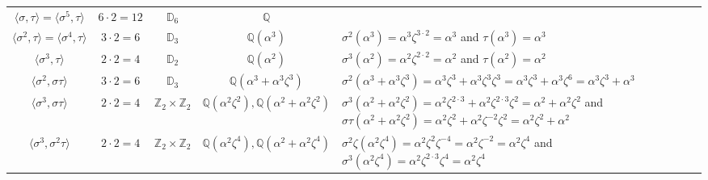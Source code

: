 \documentclass{article}
\theoremstyle{definition}
\begin{document}
\begin{tabular}{ c c c c | p{7.5cm} }
  \hline
  $\langle \sigma, \tau \rangle = \langle \sigma^5,\tau \rangle$ & $6\cdot2=12$ & $\mathbb{D}_6$ & $\mathbb{Q}$ & \\
  $\langle \sigma^2, \tau \rangle = \langle \sigma^4,\tau \rangle$ & $3\cdot2=6$ & $\mathbb{D}_3$ & $\mathbb{Q}(\alpha^3)$ &
      $\sigma^2(\alpha^3)=\alpha^3\zeta^{3\cdot 2}=\alpha^3$ and $\tau(\alpha^3)=\alpha^3$\\
  $\langle \sigma^3, \tau \rangle$ & $2\cdot2=4$ & $\mathbb{D}_2$ & $\mathbb{Q}(\alpha^2)$ &
      $\sigma^3(\alpha^2)=\alpha^2\zeta^{2\cdot 2}=\alpha^2$ and $\tau(\alpha^2)=\alpha^2$\\
  \hline
  $\langle \sigma^2, \sigma\tau \rangle$ & $3\cdot 2=6$ & $\mathbb{D}_3$ & $\mathbb{Q}(\alpha^3+\alpha^3\zeta^3)$ &
      $\sigma^2(\alpha^3 + \alpha^3 \zeta^3) = \alpha^3\zeta^3 + \alpha^3 \zeta^3\zeta^3 = \alpha^3\zeta^3 + \alpha^3\zeta^6 = \alpha^3\zeta^3+\alpha^3$\\
  $\langle \sigma^3, \sigma\tau \rangle$ & $2\cdot2=4$ & $\mathbb{Z}_2 \times \mathbb{Z}_2$ & $\mathbb{Q}(\alpha^2\zeta^2),\mathbb{Q}(\alpha^2+\alpha^2\zeta^2)$ &
      $\sigma^3(\alpha^2+\alpha^2\zeta^2)=\alpha^2\zeta^{2\cdot3}+\alpha^2\zeta^{2\cdot3}\zeta^2=\alpha^2+\alpha^2\zeta^2$
      and
      $\sigma\tau(\alpha^2+\alpha^2\zeta^2)=\alpha^2\zeta^2+\alpha^2\zeta^{-2}\zeta^2 = \alpha^2\zeta^2+\alpha^2$\\
  $\langle \sigma^3, \sigma^2\tau\rangle$ & $2\cdot2=4$ & $\mathbb{Z}_2 \times \mathbb{Z}_2$ & $\mathbb{Q}(\alpha^2\zeta^4),\mathbb{Q}(\alpha^2+\alpha^2\zeta^4)$ &
      $\sigma^2\zeta(\alpha^2\zeta^4)=\alpha^2\zeta^2\zeta^{-4}=\alpha^2\zeta^{-2}=\alpha^2\zeta^4$
      and $\sigma^3(\alpha^2\zeta^4)=\alpha^2\zeta^{2\cdot3}\zeta^4=\alpha^2\zeta^4$
\end{tabular}





\end{document}
